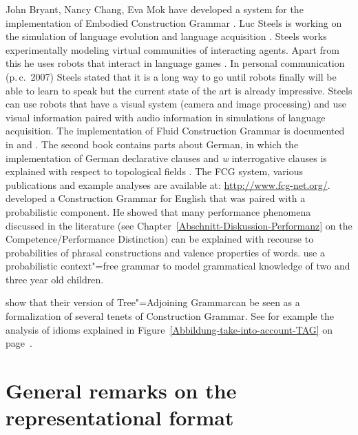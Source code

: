 John Bryant, Nancy Chang, Eva Mok
have developed a system for the implementation of Embodied Construction Grammar \citep{Bryant2003a-u}.
Luc Steels is working on the simulation of language evolution and language acquisition
\citep{Steels2003a}. Steels works experimentally modeling virtual communities of interacting
agents. Apart from this he uses robots that interact in language games \citep{Steels2015a-u}.
In personal communication (p.\,c.\ 2007) %
Steels stated that it is a long way to go until robots finally will be able to learn to speak but the
current state of the art is already impressive. Steels can use robots that have a visual system
(camera and image processing) and use visual information paired with audio information in
simulations of language acquisition. The implementation of Fluid Construction Grammar is documented in
 and . The second book contains parts about
German, in which the implementation of German declarative clauses and \emph{w} interrogative clauses
is explained with respect to topological fields \citep{Micelli2012a}. The FCG system, various
publications and example analyses are available at: \url{http://www.fcg-net.org/}.
\citet{Jurafsky96a} developed a Construction Grammar for English that was paired with a
probabilistic component. He showed that many performance phenomena
discussed in the literature (see Chapter~\ref{Abschnitt-Diskussion-Performanz} on
the Competence/Performance Distinction) can be explained with recourse to probabilities of phrasal
constructions and valence properties of words.
\citet*{BLT2009a} use a probabilistic context"=free grammar to model grammatical knowledge of two and three year old children.

\citet{LK2017a} show that their version of Tree"=Adjoining Grammar\indextag can be seen as a
formalization of several tenets of Construction Grammar. See for example the analysis of idioms
explained in Figure~\ref{Abbildung-take-into-account-TAG} on page~\pageref{Abbildung-take-into-account-TAG}.

\section{General remarks on the representational format}

